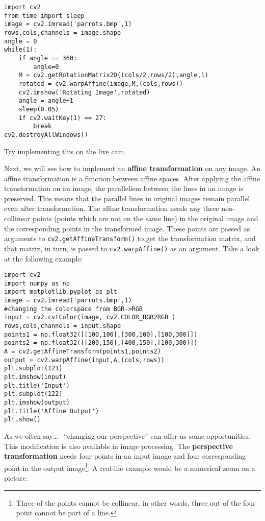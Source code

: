 \documentclass{labo}
\begin{document}
\begin{verbatim}
import cv2 
from time import sleep 
image = cv2.imread('parrots.bmp',1) 
rows,cols,channels = image.shape 
angle = 0 
while(1): 
	if angle == 360: 
		angle=0 
	M = cv2.getRotationMatrix2D((cols/2,rows/2),angle,1) 
	rotated = cv2.warpAffine(image,M,(cols,rows)) 
	cv2.imshow('Rotating Image',rotated) 
	angle = angle+1 
	sleep(0.05) 
	if cv2.waitKey(1) == 27: 
		break 
cv2.destroyAllWindows()
\end{verbatim}

\begin{leftbar}
Try implementing this on the live cam.
\end{leftbar}

Next, we will see how to implement an \textbf{affine transformation} on any image. An affine transformation is a function between affine spaces. After applying the affine transformation on an image, the parallelism between the lines in an image is preserved. This means that the parallel lines in original images remain parallel even after transformation. The affine transformation needs any three non-collinear points (points which are not on the same line) in the original image and the corresponding points in the transformed image. These points are passed as arguments to \texttt{cv2.getAffineTransform()} to get the transformation matrix, and that matrix, in turn, is passed to \texttt{cv2.warpAffine()} as an argument. Take a look at the following example:

\begin{verbatim}
import cv2 
import numpy as np 
import matplotlib.pyplot as plt 
image = cv2.imread('parrots.bmp',1) 
#changing the colorspace from BGR->RGB 
input = cv2.cvtColor(image, cv2.COLOR_BGR2RGB ) 
rows,cols,channels = input.shape 
points1 = np.float32([[100,100],[300,100],[100,300]]) 
points2 = np.float32([[200,150],[400,150],[100,300]]) 
A = cv2.getAffineTransform(points1,points2) 
output = cv2.warpAffine(input,A,(cols,rows)) 
plt.subplot(121)
plt.imshow(input)
plt.title('Input') 
plt.subplot(122)
plt.imshow(output)
plt.title('Affine Output') 
plt.show()
\end{verbatim}

As we often say\dots~ ``changing our perspective'' can offer us some opportunities. This modification is also available in image processing. The \textbf{perspective transformation} needs four points in an input image and four corresponding point in the output image\footnote{Three of the points cannot be collinear, in other words, three out of the four point cannot be part of a line.}. A real-life example would be a numerical zoom on a picture.\\
\end{document}
